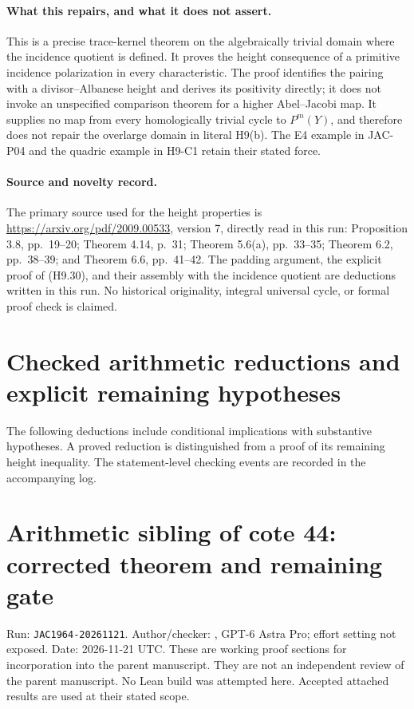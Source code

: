 \documentclass[11pt,a4paper]{article}
\begin{document}
\paragraph{What this repairs, and what it does not assert.}
This is a precise trace-kernel theorem on the algebraically trivial
domain where the incidence quotient is defined. It proves the height
consequence of a primitive incidence polarization in every characteristic.
The proof identifies the pairing with a divisor--Albanese height and
derives its positivity directly; it does not invoke an unspecified
comparison theorem for a higher Abel--Jacobi map. It supplies no map
from every homologically trivial cycle to $P^m(Y)$, and therefore does
not repair the overlarge domain in literal H9(b). The E4 example in
JAC-P04 and the quadric example in H9-C1 retain their stated force.

\paragraph{Source and novelty record.}
The primary source used for the height properties is
\url{https://arxiv.org/pdf/2009.00533}, version 7, directly read in this
run: Proposition 3.8, pp.~19--20; Theorem 4.14, p.~31; Theorem 5.6(a),
pp.~33--35; Theorem 6.2, pp.~38--39; and Theorem 6.6, pp.~41--42.
The padding argument, the explicit proof of (H9.30), and their assembly
with the incidence quotient are deductions written in this run. No
historical originality, integral universal cycle, or formal proof check
is claimed.
\section{Checked arithmetic reductions and explicit remaining hypotheses}
The following deductions include conditional implications with substantive
hypotheses. A proved reduction is distinguished from a proof of its
remaining height inequality. The statement-level checking events are
recorded in the accompanying log.
\section{Arithmetic sibling of cote 44: corrected theorem and remaining
gate}\label{arithmetic-sibling-of-cote-44-corrected-theorem-and-remaining-gate}

Run: \texttt{JAC1964-20261121}. Author/checker:
, GPT-6 Astra Pro; effort setting not
exposed. Date: 2026-11-21 UTC. These are working proof sections for
incorporation into the parent manuscript. They are not an independent
review of the parent manuscript. No Lean build was attempted here.
Accepted attached results are used at their stated scope.
\end{document}
